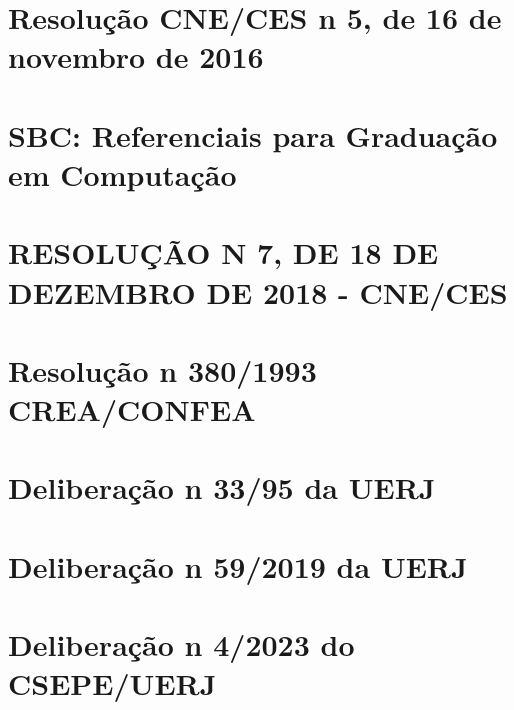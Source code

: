 \chapter{Resolução CNE/CES n\textordmasculine{} 5, de 16 de novembro de 2016}
\label{cne2016}


\chapter{SBC: Referenciais para Graduação em Computação}
\label{sbc2017}


\chapter{RESOLUÇÃO N\textordmasculine{} 7, DE 18 DE DEZEMBRO DE 2018 - CNE/CES}
\label{rcne2018}


\chapter{Resolução n\textordmasculine{} 380/1993 CREA/CONFEA}
\label{confea1993}


\chapter{Deliberação n\textordmasculine{} 33/95 da UERJ}
\label{delib3395}


\chapter{Deliberação n\textordmasculine{} 59/2019 da UERJ}
\label{delib592019}




%
%
%
%
%
%
%



\chapter{Deliberação n\textordmasculine{} 4/2023 do CSEPE/UERJ}
\label{del4}

